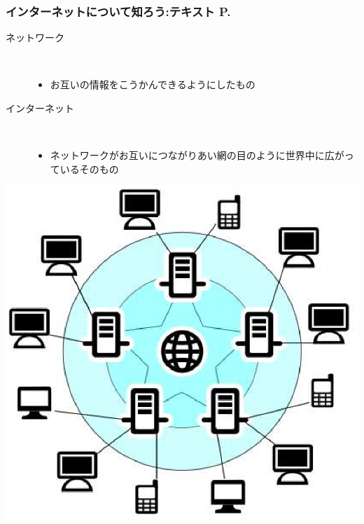 \documentclass[dvipdfmx]{beamer}
\begin{document}
\begin{frame}[fragile]
	\frametitle{インターネットについて知ろう:テキスト P.\pageref{1:P:internet}~~~}
		\begin{description}
			\item[ネットワーク] ~\\
				\begin{itemize}
					\item お互いの情報をこうかんできるようにしたもの
				\end{itemize}

			\item[インターネット]~\\
				\begin{itemize}
					\item ネットワークがお互いにつながりあい網の目のように世界中に広がっているそのもの
				\end{itemize}
		\end{description}
		\vfill
        \begin{minipage}{0.5\textwidth}
            {\upshape
              \includegraphics[width=\textwidth]{ome7-img002.eps}}
        \end{minipage}
\end{frame}
\end{document}
